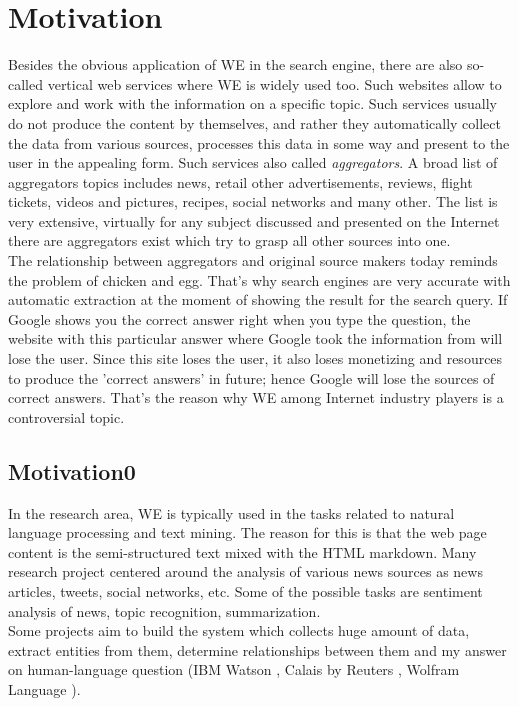 
\section{Motivation}
Besides the obvious application of WE in the search engine, there are also so-called vertical web services where WE is widely used too. Such websites allow to explore and work with the information on a specific topic. Such services usually do not produce the content by themselves, and rather they automatically collect the data from various sources, processes this data in some way and present to the user in the appealing form. Such services also called \textit{aggregators}. A broad list of aggregators topics includes news, retail other advertisements, reviews, flight tickets, videos and pictures, recipes, social networks and many other. The list is very extensive, virtually for any subject discussed and presented on the Internet there are aggregators exist which try to grasp all other sources into one. \\


The relationship between aggregators and original source makers today reminds the problem of chicken and egg. That's why search engines are very accurate with automatic extraction at the moment of showing the result for the search query. If Google shows you the correct answer right when you type the question, the website with this particular answer where Google took the information from will lose the user. Since this site loses the user, it also loses monetizing and resources to produce the 'correct answers' in future; hence Google will lose the sources of correct answers. That's the reason why WE among Internet industry players is a controversial topic.\\
\subsection{Motivation0}
In the research area, WE is typically used in the tasks related to natural language processing and text mining. The reason for this is that the web page content is the semi-structured text mixed with the HTML markdown. Many research project centered around the analysis of various news sources as news articles, tweets, social networks, etc. Some of the possible tasks are sentiment analysis of news, topic recognition, summarization. \\

Some projects aim to build the system which collects huge amount of data, extract entities from them, determine relationships between them and my answer on human-language question (IBM Watson \cite{IBMAlchemy}, Calais by Reuters \cite{Calais}, Wolfram Language \cite{Wolfram}).\\      


